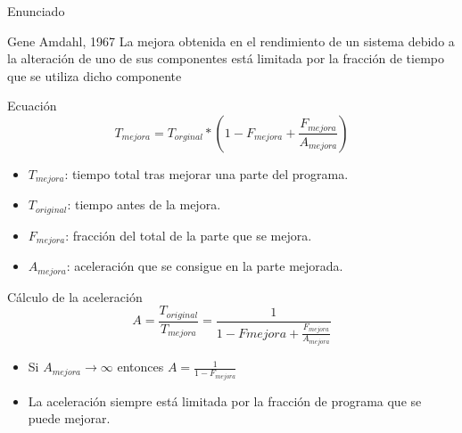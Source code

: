 \documentclass[utf8]{beamer}
\begin{document}
\begin{frame}[allowframebreaks]{Enunciado}
    \begin{block}{Gene Amdahl, 1967}
        La mejora obtenida en el rendimiento de un sistema debido a la alteración de uno de sus componentes está limitada por la fracción de tiempo que se utiliza dicho componente
    \end{block}
    \begin{block}{Ecuación}
        $$ T_{mejora} = T_{orginal} * (1 - F_{mejora} + \frac{F_{mejora}}{A_{mejora}}) $$
        \begin{itemize}
            \item $T_{mejora}$: tiempo total tras mejorar una parte del programa.
            \item $T_{original}$: tiempo antes de la mejora.
            \item $F_{mejora}$: fracción del total de la parte que se mejora.
            \item $A_{mejora}$: aceleración que se consigue en la parte mejorada.
        \end{itemize}
    \end{block}
    \begin{block}{Cálculo de la aceleración}
        $$ A = \frac{T_{original}}{T_{mejora}} = \frac{1}{1-F{mejora}+\frac{F_{mejora}}{A_{mejora}}} $$
        \begin{itemize}
        \item Si $A_{mejora} \rightarrow \infty$ entonces $A = \frac{1}{1 - F_{mejora}}$ \\
        \item La aceleración siempre está limitada por la fracción de programa que se puede mejorar.
        \end{itemize}
    \end{block}
\end{frame}
\end{document}
